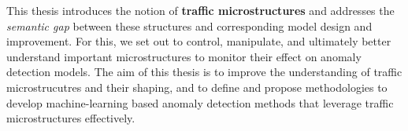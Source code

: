
This thesis introduces the notion of \textbf{traffic microstructures} and addresses the \textit{semantic gap} between these structures and corresponding model design and improvement. For this, we set out to control, manipulate, and ultimately better understand important microstructures to monitor their effect on anomaly detection models. The aim of this thesis is to improve the understanding of traffic microstrucutres and their shaping, and to define and propose methodologies to develop machine-learning based anomaly detection methods that leverage traffic microstructures effectively.











